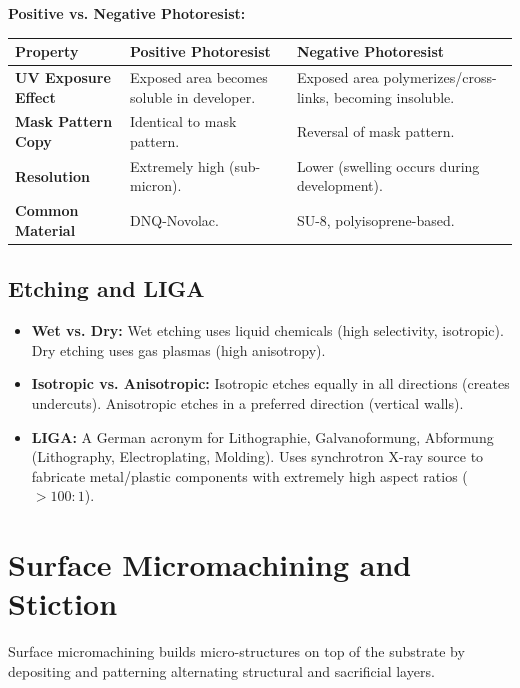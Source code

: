 \documentclass[12pt,a4paper]{article}
\begin{document}
\textbf{Positive vs. Negative Photoresist:}\par\noindent
\begin{tabularx}{\linewidth}{|B{3.2cm}|Y|Y|}
\hline
\textbf{Property} & \textbf{\color{myteal}Positive Photoresist} & \textbf{\color{mygreen}Negative Photoresist} \\
\hline
\textbf{UV Exposure Effect} & Exposed area becomes soluble in developer. & Exposed area polymerizes/cross-links, becoming insoluble. \\
\hline
\textbf{Mask Pattern Copy} & Identical to mask pattern. & Reversal of mask pattern. \\
\hline
\textbf{Resolution} & Extremely high (sub-micron). & Lower (swelling occurs during development). \\
\hline
\textbf{Common Material} & DNQ-Novolac. & SU-8, polyisoprene-based. \\
\hline
\end{tabularx}

\subsection{Etching and LIGA}
\begin{itemize}[leftmargin=*, itemsep=3.5pt]
  \item \textbf{Wet vs. Dry:} Wet etching uses liquid chemicals (high selectivity, isotropic). Dry etching uses gas plasmas (high anisotropy).
  \item \textbf{Isotropic vs. Anisotropic:} Isotropic etches equally in all directions (creates undercuts). Anisotropic etches in a preferred direction (vertical walls).
  \item \textbf{LIGA:} A German acronym for Lithographie, Galvanoformung, Abformung (Lithography, Electroplating, Molding). Uses synchrotron X-ray source to fabricate metal/plastic components with extremely high aspect ratios ($>100:1$).
\end{itemize}

\section{Surface Micromachining and Stiction}

Surface micromachining builds micro-structures on top of the substrate by depositing and patterning alternating structural and sacrificial layers.
\end{document}
